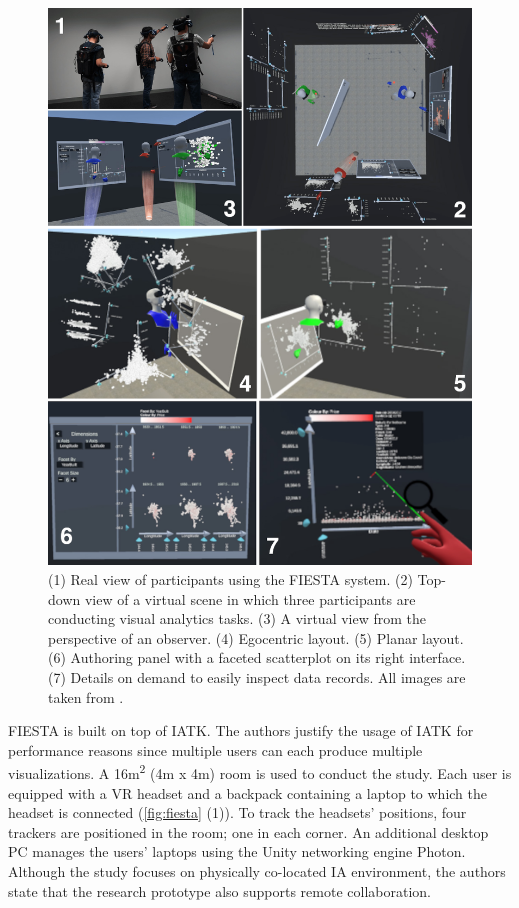 \documentclass{vgtc}                          %
\begin{document}
\begin{figure}[tb]
	\centering
	\includegraphics[width=\columnwidth]{fiesta}
	\caption{(1) Real view of participants using the FIESTA system. (2)
		Top-down view of a virtual scene in which three participants are
		conducting visual analytics tasks. (3) A virtual view from the perspective of an
		observer. (4) Egocentric layout. (5) Planar layout. (6) Authoring panel
		with a faceted scatterplot on its right interface. (7) Details on
		demand to easily inspect data records. All images are taken from
		\cite{fiesta_prototype}.}
	\label{fig:fiesta}
\end{figure}

\noindent FIESTA is built on top of IATK. The authors justify the usage of IATK
for performance reasons since multiple users can each produce multiple
visualizations. A 16m\textsuperscript{2} (4m x 4m) room is used to conduct the
study. Each user is equipped with a VR headset and a backpack containing a
laptop to which the headset is connected (\autoref{fig:fiesta} (1)). To track the
headsets' positions, four trackers are positioned in the room; one in each
corner. An additional desktop PC manages the users' laptops using the Unity
networking engine Photon. Although the study focuses on physically co-located
IA environment, the authors state that the research prototype also supports
remote collaboration.
\end{document}
